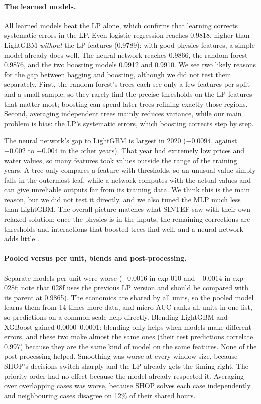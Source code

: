 \paragraph{The learned models.} All learned models beat the LP alone, which confirms that learning corrects systematic errors in the LP. Even logistic regression reaches 0.9818, higher than LightGBM \emph{without} the LP features (0.9789): with good physics features, a simple model already does well. The neural network reaches 0.9866, the random forest 0.9876, and the two boosting models 0.9912 and 0.9910. We see two likely reasons for the gap between bagging and boosting, although we did not test them separately. First, the random forest's trees each see only a few features per split and a small sample, so they rarely find the precise thresholds on the LP features that matter most; boosting can spend later trees refining exactly those regions. Second, averaging independent trees mainly reduces variance, while our main problem is bias: the LP's systematic errors, which boosting corrects step by step.

The neural network's gap to LightGBM is largest in 2020 ($-0.0094$, against $-0.002$ to $-0.004$ in the other years). That year had extremely low prices and water values, so many features took values outside the range of the training years. A tree only compares a feature with thresholds, so an unusual value simply falls in the outermost leaf, while a network computes with the actual values and can give unreliable outputs far from its training data. We think this is the main reason, but we did not test it directly, and we also tuned the MLP much less than LightGBM. The overall picture matches what SINTEF saw with their own relaxed solution: once the physics is in the inputs, the remaining corrections are thresholds and interactions that boosted trees find well, and a neural network adds little \citep{barjaktarevic2026,grinsztajn2022}.

\paragraph{Pooled versus per unit, blends and post-processing.} Separate models per unit were worse ($-0.0016$ in exp 010 and $-0.0014$ in exp 028f; note that 028f uses the previous LP version and should be compared with its parent at 0.9865). The economics are shared by all units, so the pooled model learns them from 14 times more data, and micro-AUC ranks all units in one list, so predictions on a common scale help directly. Blending LightGBM and XGBoost gained 0.0000--0.0001: blending only helps when models make different errors, and these two make almost the same ones (their test predictions correlate 0.997) because they are the same kind of model on the same features. None of the post-processing helped. Smoothing was worse at every window size, because SHOP's decisions switch sharply and the LP already gets the timing right. The priority order had no effect because the model already respected it. Averaging over overlapping cases was worse, because SHOP solves each case independently and neighbouring cases disagree on 12\% of their shared hours.

